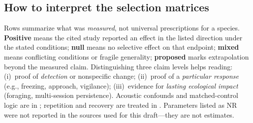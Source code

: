 
\subsection*{How to interpret the selection matrices}
\label{sec:selection-matrix-howto}

Rows summarize what was \emph{measured}, not universal prescriptions for a species. \textbf{Positive} means the cited study reported an effect in the listed direction under the stated conditions; \textbf{null} means no selective effect on that endpoint; \textbf{mixed} means conflicting conditions or fragile generality; \textbf{proposed} marks extrapolation beyond the measured claim. Distinguishing three claim levels helps reading: (i)~proof of \emph{detection} or nonspecific change; (ii)~proof of a \emph{particular response} (e.g., freezing, approach, vigilance); (iii)~evidence for \emph{lasting ecological impact} (foraging, multi-session persistence). Acoustic confounds and matched-control logic are in ; repetition and recovery are treated in . Parameters listed as NR were not reported in the sources used for this draft---they are not estimates.

